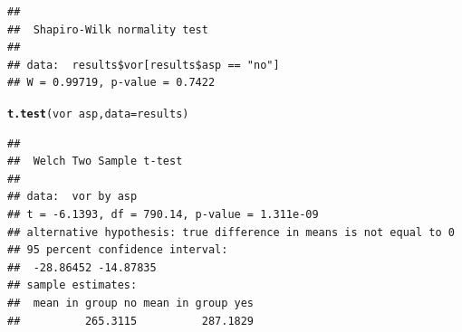\documentclass[a4paper,11pt]{article}\usepackage[]{graphicx}\usepackage[]{color}
\makeatletter
\newcommand{\hlopt}[1]{\textcolor[rgb]{0,0,0}{#1}}%
\newcommand{\hlstd}[1]{\textcolor[rgb]{0.345,0.345,0.345}{#1}}%
\newcommand{\hlkwc}[1]{\textcolor[rgb]{0.333,0.667,0.333}{#1}}%
\newcommand{\hlkwd}[1]{\textcolor[rgb]{0.737,0.353,0.396}{\textbf{#1}}}%
\newenvironment{kframe}{%
 \def\at@end@of@kframe{}%
 \ifinner\ifhmode%
  \def\at@end@of@kframe{\end{minipage}}%
  \begin{minipage}{\columnwidth}%
 \fi\fi%
 \def\FrameCommand##1{\hskip\@totalleftmargin \hskip-\fboxsep
 \colorbox{shadecolor}{##1}\hskip-\fboxsep
     \hskip-\linewidth \hskip-\@totalleftmargin \hskip\columnwidth}%
 \MakeFramed {\advance\hsize-\width
   \@totalleftmargin\z@ \linewidth\hsize
   \@setminipage}}%
 {\par\unskip\endMakeFramed%
 \at@end@of@kframe}
\newenvironment{knitrout}{}{} %
\makeatother
\begin{document}
\begin{knitrout}
\begin{kframe}
\begin{verbatim}
## 
## 	Shapiro-Wilk normality test
## 
## data:  results$vor[results$asp == "no"]
## W = 0.99719, p-value = 0.7422
\end{verbatim}
\begin{alltt}
\hlkwd{t.test}\hlstd{(vor} \hlopt{~} \hlstd{asp,} \hlkwc{data} \hlstd{= results)}
\end{alltt}
\begin{verbatim}
## 
## 	Welch Two Sample t-test
## 
## data:  vor by asp
## t = -6.1393, df = 790.14, p-value = 1.311e-09
## alternative hypothesis: true difference in means is not equal to 0
## 95 percent confidence interval:
##  -28.86452 -14.87835
## sample estimates:
##  mean in group no mean in group yes 
##          265.3115          287.1829
\end{verbatim}
\end{kframe}
\end{knitrout}
\end{document}
